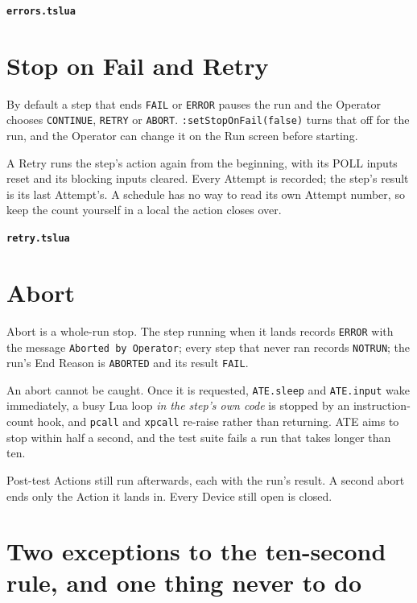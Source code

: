\noindent\textbf{\texttt{errors.tslua}}\par


\section{Stop on Fail and Retry}

By default a step that ends \texttt{FAIL} or \texttt{ERROR} pauses the run and the Operator
chooses \texttt{CONTINUE}, \texttt{RETRY} or \texttt{ABORT}. \texttt{:setStopOnFail(false)}
turns that off for the run, and the Operator can change it on the Run screen before starting.

A Retry runs the step's action again from the beginning, with its POLL inputs reset and its
blocking inputs cleared. Every Attempt is recorded; the step's result is its last Attempt's. A
schedule has no way to read its own Attempt number, so keep the count yourself in a local the
action closes over.

\noindent\textbf{\texttt{retry.tslua}}\par


\section{Abort}

Abort is a whole-run stop. The step running when it lands records \texttt{ERROR} with the
message \texttt{Aborted by Operator}; every step that never ran records \texttt{NOTRUN}; the
run's End Reason is \texttt{ABORTED} and its result \texttt{FAIL}.

An abort cannot be caught. Once it is requested, \texttt{ATE.sleep} and \texttt{ATE.input} wake
immediately, a busy Lua loop \emph{in the step's own code} is stopped by an instruction-count
hook, and \texttt{pcall} and \texttt{xpcall} re-raise rather than returning. ATE aims to stop
within half a second, and the test suite fails a run that takes longer than ten.

Post-test Actions still run afterwards, each with the run's result. A second abort ends only the
Action it lands in. Every Device still open is closed.

\section{Two exceptions to the ten-second rule, and one thing never to do}

